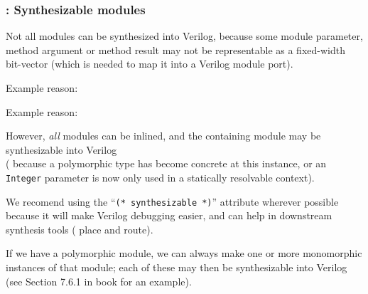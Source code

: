 
\begin{frame}[fragile]
\frametitle{{\BSV}: Synthesizable modules}

\footnotesize

Not all {\BSV} modules can be synthesized into Verilog, because some
module parameter, method argument or method result may not be
representable as a fixed-width bit-vector (which is needed to map it
into a Verilog module port).

\vspace{2ex}

Example reason: \hm
{}

Example reason: \hm
{}

\vspace{1ex}

\PAUSE{\vspace{2ex}}

However, \emph{all} {\BSV} modules can be inlined, and the containing
module may be synthesizable into Verilog \\
({\eg} because a polymorphic type has become concrete at this
instance, or an {\tt Integer} parameter is now only used in a
statically resolvable context).

\PAUSE{\vspace{2ex}}

We recomend using the ``{\tt (* synthesizable *)}'' attribute wherever
possible because it will make Verilog debugging easier, and can help
in downstream synthesis tools ({\eg} place and route).

\PAUSE{\vspace{2ex}}

If we have a polymorphic module, we can always make one or more
monomorphic instances of that module; each of these may then be
synthesizable into Verilog (see Section 7.6.1 in book for an example).

\end{frame}

